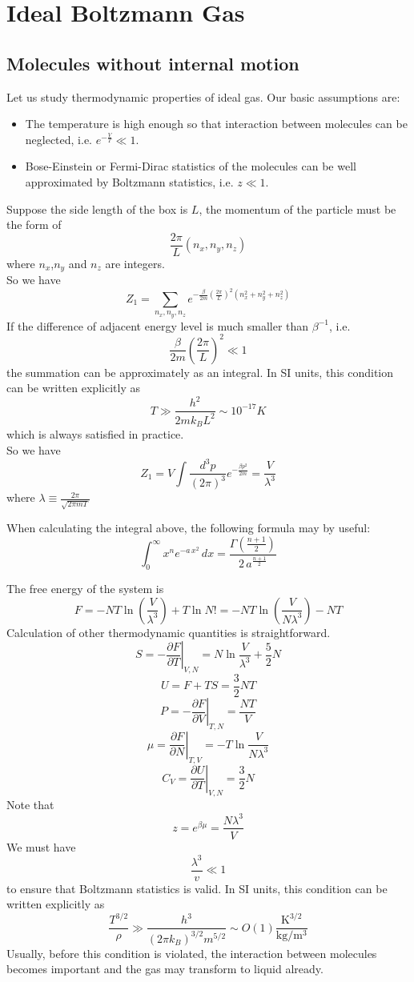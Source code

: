 \section{Ideal Boltzmann Gas}
\subsection{Molecules without internal motion}
Let us study thermodynamic properties of ideal gas. Our basic assumptions are:
\begin{itemize}
\item The temperature is high enough so that interaction between molecules can be neglected, i.e. $e^{-\frac{V}{T}} \ll 1$.
\item Bose-Einstein or Fermi-Dirac statistics of the molecules can be well approximated by Boltzmann statistics, i.e. $z \ll 1$.
\end{itemize}
Suppose the side length of the box is $L$, the momentum of the particle must be the form of
\[\frac{2\pi}{L}(n_x,n_y,n_z)\]
where $n_x$,$n_y$ and $n_z$ are integers. 
\\
So we have
\[Z_1 = \sum_{n_x,n_y,n_z} e^{-\frac{\beta}{2m} (\frac{2\pi}{L})^2(n_x^2 + n_y^2 + n_z^2)}\]
If the difference of adjacent energy level is much smaller than $\beta^{-1}$, i.e.
\[\frac{\beta}{2m} (\frac{2\pi}{L})^2 \ll 1\] 
the summation can be approximately as an integral. 
In SI units, this condition can be written explicitly as
\[T \gg \frac{h^2}{2mk_BL^2} \sim 10^{-17}K\] 
which is always satisfied in practice. 
\\
So we have
\[Z_1 = V \int \frac{d^3p}{(2\pi)^3} e^{-\frac{\beta p^2}{2m}} = \frac{V}{\lambda^3}\]
where $\lambda \equiv \frac{2\pi}{\sqrt{2\pi m T}}$
\begin{note}
When calculating the integral above, the following formula may by useful: 
\[\int _{0}^{\infty }x^{n}e^{-a\,x^{2}}\,dx={\frac {\Gamma ({\frac {n+1}{2}})}{2\,a^{\frac {n+1}{2}}}}\]
\end{note}
\noindent
The free energy of the system is
\[F = -NT\ln(\frac{V}{\lambda^3}) + T\ln N! = -NT\ln(\frac{V}{N\lambda^3}) - NT\]
Calculation of other thermodynamic quantities is straightforward.
\[S = -\left. \frac{\partial F}{\partial T} \right|_{V,N} = N \ln \frac{V}{\lambda^3} + \frac{5}{2}N\]
\[U = F + TS = \frac{3}{2}NT\]
\[P = -\left. \frac{\partial F}{\partial V} \right|_{T,N} = \frac{NT}{V}\]
\[\mu = \left. \frac{\partial F}{\partial N} \right|_{T,V} = -T \ln \frac{V}{N\lambda^3}\]
\[C_V = \left. \frac{\partial U}{\partial T} \right|_{V,N} = \frac{3}{2}N\]
Note that
\[z = e^{\beta \mu} = \frac{N\lambda^3}{V}\]
We must have
\[\frac{\lambda^3}{v} \ll 1\]
to ensure that Boltzmann statistics is valid. 
In SI units, this condition can be written explicitly as
\[\frac{T^{3/2}}{\rho} \gg \frac{h^3}{(2\pi k_B )^{3/2}m^{5/2}} \sim O(1) \frac{\mathrm{K^{3/2}}}{\mathrm{kg/m^3}}\]
Usually, before this condition is violated, the interaction between molecules becomes important and the gas may transform to liquid already.

